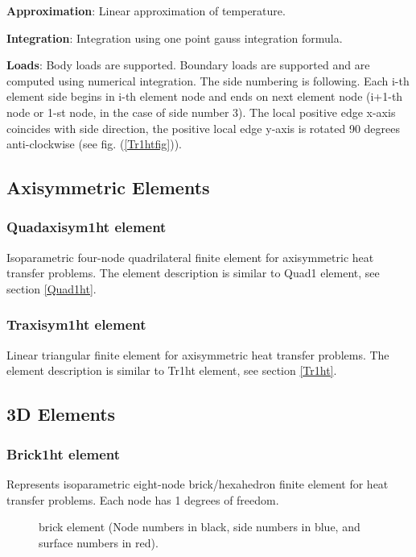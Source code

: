 \documentclass[a4paper]{article}
\newcommand{\descitem}[1]{{\noindent \bf #1}:}
\begin{document}
\descitem{Approximation} Linear approximation of temperature.

\descitem{Integration}
Integration using one point gauss integration formula.

\descitem{Loads} Body loads are supported. Boundary loads are
supported and are computed  using numerical integration. The side numbering is
following. Each i-th element side begins in i-th element node and
ends on next element node (i+1-th node or 1-st node, in the case of 
side number 3). The local positive edge x-axis coincides with side
direction, the positive local edge y-axis is rotated 90 degrees
anti-clockwise (see fig. (\ref{Tr1htfig})).



\subsection{Axisymmetric Elements}
\subsubsection{Quadaxisym1ht element}
Isoparametric four-node quadrilateral finite element for
axisymmetric heat transfer problems. The element description is
similar to Quad1 element, see section \ref{Quad1ht}.


\subsubsection{Traxisym1ht element}
Linear triangular finite element for axisymmetric heat transfer
problems. The element description is
similar to Tr1ht element, see section \ref{Tr1ht}.

\subsection{3D Elements}
\subsubsection{Brick1ht element}
\label{Brick1ht}
Represents isoparametric eight-node brick/hexahedron finite element for
heat transfer problems. Each node has 1 degrees of freedom.
\begin{figure}[tb]
 \centering
 \begin{makeimage}
  
 \end{makeimage}
 \caption{brick element (Node numbers in black, side numbers in blue,
 and surface numbers in red).}
 \label{Brick1htfig}
\end{figure}
\end{document}
